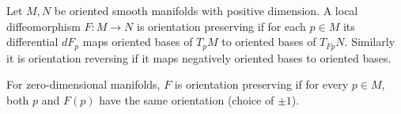 \eprop

\bdefn

    Let $M,N$ be oriented smooth manifolds with positive dimension.
    A local diffeomorphism $F\colon M\to N$ is {\emphcolor orientation preserving} if for each $p\in M$ its differential
    $dF_p$ maps oriented bases of $T_pM$ to oriented bases of $T_{Fp}N$.
    Similarly it is {\emphcolor orientation reversing} if it maps negatively oriented bases to oriented bases.

    For zero-dimensional manifolds, $F$ is orientation preserving if for every $p\in M$, both $p$ and $F(p)$ have the same
    orientation (choice of $\pm1$).

\edefn

